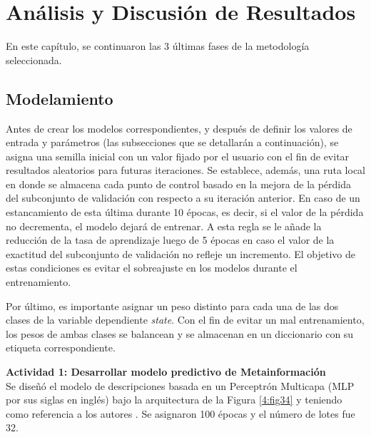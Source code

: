 \chapter{Análisis y Discusión de Resultados}
En este capítulo, se continuaron las 3 últimas fases de la metodología seleccionada.

\section{Modelamiento}
Antes de crear los modelos correspondientes, y después de definir los valores de entrada y parámetros (las subsecciones que se detallarán a continuación), se asigna una semilla inicial con un valor fijado por el usuario con el fin de evitar resultados aleatorios para futuras iteraciones. Se establece, además, una ruta local en donde se almacena cada punto de control basado en la mejora de la pérdida del subconjunto de validación con respecto a su iteración anterior. En caso de un estancamiento de esta última durante 10 épocas, es decir, si el valor de la pérdida no decrementa, el modelo dejará de entrenar. A esta regla se le añade la reducción de la tasa de aprendizaje luego de 5 épocas en caso el valor de la exactitud del subconjunto de validación no refleje un incremento. El objetivo de estas condiciones es evitar el sobreajuste en los modelos durante el entrenamiento.

Por último, es importante asignar un peso distinto para cada una de las dos clases de la variable dependiente \textit{state}. Con el fin de evitar un mal entrenamiento, los pesos de ambas clases se balancean y se almacenan en un diccionario con su etiqueta correspondiente.

\textbf{Actividad 1: Desarrollar modelo predictivo de Metainformación}
\\
Se diseñó el modelo de descripciones basada en un Perceptrón Multicapa (MLP por sus siglas en inglés) bajo la arquitectura de la Figura \ref{4:fig34} y teniendo como referencia a los autores \citeauthor{pr_yu2018deeplearning}. Se asignaron 100 épocas y el número de lotes fue 32.

